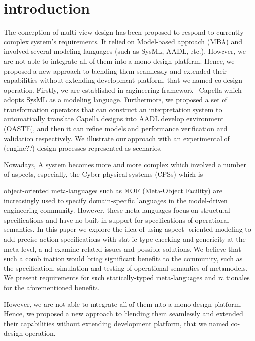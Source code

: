 \section{introduction}
The conception of multi-view design has been proposed to respond to currently complex system's requirements. It relied on Model-based approach (MBA) and involved several modeling languages (such as SysML, AADL, etc.). However, we are not able to integrate all of them into a mono design platform. Hence, we proposed a new approach to blending them seamlessly and extended their capabilities without extending development platform, that we named co-design operation. Firstly, we are established in engineering framework --Capella which adopts SysML as a modeling language. Furthermore, we proposed a set of transformation operators that can construct an interpretation system to automatically translate  Capella designs into AADL develop environment (OASTE), and then it can refine models and performance verification and validation respectively. We illustrate our approach with an experimental of (engine??) design processes represented as scenarios.


Nowadays, A system becomes more and more complex which involved a number of aspects, especially, the Cyber-physical systems (CPSs) which is 


object-oriented  meta-languages such as MOF (Meta-Object Facility) are increasingly used to  specify domain-specific languages in  the   model-driven   engineering   community.   However,   these   meta-languages focus on structural specifications and have no built-in support for specifications 
of  operational  semantics.  In  this  paper  
we  explore  the  idea  of  using  aspect-
oriented modeling to add precise action specifications with stat
ic type checking 
and  genericity  at  the  meta  level,  a
nd  examine  related  issues  and  possible  
solutions. We believe that such a comb
ination would bring significant benefits 
to   the   community,   such   as   the   specification,   simulation   and   testing   of   
operational   semantics   of   
metamodels.   We   present   requirements   for   such   
statically-typed meta-languages and ra
tionales for the aforementioned benefits. 





However, we are not able to integrate all of them into a mono design platform. Hence, we proposed a new approach to blending them seamlessly and extended their capabilities without extending development platform, that we named co-design operation. 